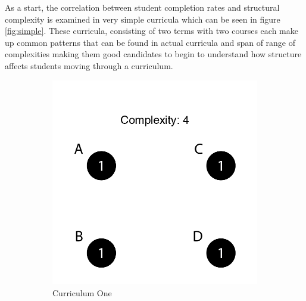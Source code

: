 \documentclass[botnum, fleqn]{unmeethesis}
\begin{document}
    As a start, the correlation between student completion rates and structural complexity is examined in very simple curricula which can be seen in figure \ref{fig:simple}. These curricula, consisting of two terms with two courses each make up common patterns that can be found in actual curricula and span of range of complexities making them good candidates to begin to understand how structure affects students moving through a curriculum.

    \begin{figure}
      \centering
      \begin{subfigure}[h!]{.3\linewidth}
        \includegraphics[width=\linewidth]{./figures/Simple4.png}
        \caption{Curriculum One}\label{fig:simple4}
      \end{subfigure}
      \begin{subfigure}[h!]{.3\linewidth}

\end{subfigure}
\end{figure}
\end{document}
